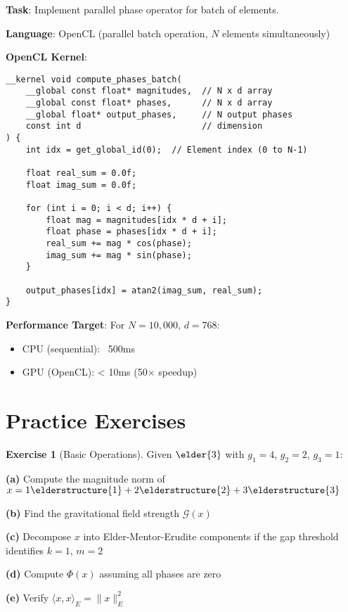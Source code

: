 \documentclass[12pt,a4paper]{article}
\theoremstyle{definition}
\newtheorem{exercise}{Exercise}[section]
\theoremstyle{remark}
\begin{document}
\begin{tcolorbox}[colback=cyan!5,colframe=cyan!70!black,title=Coding Exercise: GPU Acceleration]
\textbf{Task}: Implement parallel phase operator for batch of elements.

\textbf{Language}: OpenCL (parallel batch operation, $N$ elements simultaneously)

\textbf{OpenCL Kernel}:
\begin{verbatim}
__kernel void compute_phases_batch(
    __global const float* magnitudes,  // N x d array
    __global const float* phases,      // N x d array  
    __global float* output_phases,     // N output phases
    const int d                        // dimension
) {
    int idx = get_global_id(0);  // Element index (0 to N-1)
    
    float real_sum = 0.0f;
    float imag_sum = 0.0f;
    
    for (int i = 0; i < d; i++) {
        float mag = magnitudes[idx * d + i];
        float phase = phases[idx * d + i];
        real_sum += mag * cos(phase);
        imag_sum += mag * sin(phase);
    }
    
    output_phases[idx] = atan2(imag_sum, real_sum);
}
\end{verbatim}

\textbf{Performance Target}: For $N=10,000$, $d=768$:
\begin{itemize}
\item CPU (sequential): ~500ms
\item GPU (OpenCL): < 10ms (50× speedup)
\end{itemize}
\end{tcolorbox}

\newpage
\section{Practice Exercises}

\begin{exercise}[Basic Operations]
Given $\elder{3}$ with $g_1 = 4$, $g_2 = 2$, $g_3 = 1$:

\textbf{(a)} Compute the magnitude norm of $x = 1\elderstructure{1} + 2\elderstructure{2} + 3\elderstructure{3}$

\textbf{(b)} Find the gravitational field strength $\mathcal{G}(x)$

\textbf{(c)} Decompose $x$ into Elder-Mentor-Erudite components if the gap threshold identifies $k=1$, $m=2$

\textbf{(d)} Compute $\Phi(x)$ assuming all phases are zero

\textbf{(e)} Verify $\langle x, x \rangle_E = \|x\|_E^2$
\end{exercise}
\end{document}
